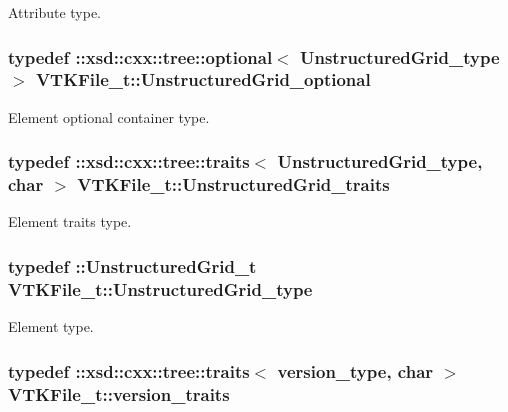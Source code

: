 Attribute type. 

\hypertarget{classVTKFile__t_ada5bb5a706e03ef1ab2ed1513ea83833}{
\subsubsection[{Unstructured\-Grid\-\_\-optional}]{\setlength{\rightskip}{0pt plus 5cm}typedef \-::xsd\-::cxx\-::tree\-::optional$<$ {\bf Unstructured\-Grid\-\_\-type} $>$ {\bf V\-T\-K\-File\-\_\-t\-::\-Unstructured\-Grid\-\_\-optional}}}\label{classVTKFile__t_ada5bb5a706e03ef1ab2ed1513ea83833}


Element optional container type. 

\hypertarget{classVTKFile__t_a02772a5f713678f02e94188d6a552528}{
\subsubsection[{Unstructured\-Grid\-\_\-traits}]{\setlength{\rightskip}{0pt plus 5cm}typedef \-::xsd\-::cxx\-::tree\-::traits$<$ {\bf Unstructured\-Grid\-\_\-type}, char $>$ {\bf V\-T\-K\-File\-\_\-t\-::\-Unstructured\-Grid\-\_\-traits}}}\label{classVTKFile__t_a02772a5f713678f02e94188d6a552528}


Element traits type. 

\hypertarget{classVTKFile__t_a34ea02f6804e701657f11a8dc3851951}{
\subsubsection[{Unstructured\-Grid\-\_\-type}]{\setlength{\rightskip}{0pt plus 5cm}typedef \-::{\bf Unstructured\-Grid\-\_\-t} {\bf V\-T\-K\-File\-\_\-t\-::\-Unstructured\-Grid\-\_\-type}}}\label{classVTKFile__t_a34ea02f6804e701657f11a8dc3851951}


Element type. 

\hypertarget{classVTKFile__t_a5a343e08417564e5db3f48859b1a0c5f}{
\subsubsection[{version\-\_\-traits}]{\setlength{\rightskip}{0pt plus 5cm}typedef \-::xsd\-::cxx\-::tree\-::traits$<$ {\bf version\-\_\-type}, char $>$ {\bf V\-T\-K\-File\-\_\-t\-::version\-\_\-traits}}}\label{classVTKFile__t_a5a343e08417564e5db3f48859b1a0c5f}


